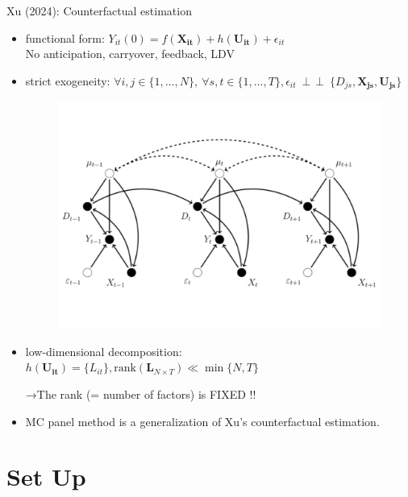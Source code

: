 \documentclass[xcolor=svgnames,aspectratio=169]{beamer}
\newcommand{\indep}{\mathop{\perp\!\!\!\!\perp}}
\begin{document}
\begin{frame}{Xu (2024): Counterfactual estimation}
    \begin{itemize}
        \item functional form: 
        $
        Y_{it}(0)=f(\mathbf{X_{it}})+h(\mathbf{U_{it}})+\epsilon_{it}
        $ \\
        \rightarrow No anticipation, carryover, feedback, LDV
        \item strict exogeneity:
        $
        \forall i,j\in\{1,\dots,N\},\ \forall s,t\in\{1,\dots,T\}, \epsilon_{it}\ \indep\ \{D_{js}, \mathbf{X_{js}}, \mathbf{U_{js}}\}
        $
        \begin{figure}
            \includegraphics[width=\textwidth, height=0.4\textheight, keepaspectratio]{Xu_DAG.pdf}
        \end{figure}
        \item low-dimensional decomposition:
        $
        h(\mathbf{U_{it}})=\{L_{it}\}, \mathrm{rank}(\mathbf{L}_{N\times T}) \ll \min\{N,T\}
        $

        →The rank (= number of factors) is \alert{FIXED !!}
        \item MC panel method is a generalization of Xu's counterfactual estimation.
    \end{itemize}
\end{frame}

\section{Set Up}
\end{document}
